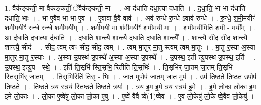 \documentclass[17pt]{extarticle}
\begin{document}
1. वैक॑ङ्कती॒ मा वैक॑ङ्कतीं॒ ॅवैक॑ङ्कती॒ मा । . आ द॑धाति दधा॒त्या द॑धाति । . द॒धा॒ति॒ भा भा द॑धाति दधाति॒ भाः । . भा ए॒वैव भा भा ए॒व । . ए॒वावा वै॒वै वाव॑ । . अव॑ रुन्धे रु॒न्धे ऽवाव॑ रुन्धे । . रु॒न्धे॒ श॒मी॒मयीꣳ॑ शमी॒मयीꣳ॑ रुन्धे रुन्धे शमी॒मयी᳚म् । . श॒मी॒मयी॒ मा श॑मी॒मयीꣳ॑ शमी॒मयी॒ मा । . श॒मी॒मयी॒मिति॑ शमी - मयी᳚म् । . आ द॑धाति दधा॒त्या द॑धाति । . द॒धा॒ति॒ शान्त्यै॒ शान्त्यै॑ दधाति दधाति॒ शान्त्यै᳚ । . शान्त्यै॒ सीद॒ सीद॒ शान्त्यै॒ शान्त्यै॒ सीद॑ । . सीद॒ त्वम् त्वꣳ सीद॒ सीद॒ त्वम् । . त्वम् मा॒तुर् मा॒तु स्त्वम् त्वम् मा॒तुः । . मा॒तु र॒स्या अ॒स्या मा॒तुर् मा॒तु र॒स्याः । . अ॒स्या उ॒पस्थ॑ उ॒पस्थे॑ अ॒स्या अ॒स्या उ॒पस्थे᳚ । . उ॒पस्थ॒ इती त्यु॒पस्थ॑ उ॒पस्थ॒ इति॑ । . उ॒पस्थ॒ इत्यु॒प - स्थे॒ । . इति॑ ति॒सृभि॑ स्ति॒सृभि॒ रितीति॑ ति॒सृभिः॑ । . ति॒सृभि॑र् जा॒तम् जा॒तम् ति॒सृभि॑ स्ति॒सृभि॑र् जा॒तम् । . ति॒सृभि॒रिति॑ ति॒सृ - भिः॒ । . जा॒त मुपोप॑ जा॒तम् जा॒त मुप॑ । . उप॑ तिष्ठते तिष्ठत॒ उपोप॑ तिष्ठते । . ति॒ष्ठ॒ते॒ त्रय॒ स्त्रय॑ स्तिष्ठते तिष्ठते॒ त्रयः॑ । . त्रय॑ इ॒म इ॒मे त्रय॒ स्त्रय॑ इ॒मे । . इ॒मे लो॒का लो॒का इ॒म इ॒मे लो॒काः । . लो॒का ए॒ष्वे॑षु लो॒का लो॒का ए॒षु । . ए॒ष्वे॑ वैवै ष्वे᳚(1॒)ष्वे॑व । . ए॒व लो॒केषु॑ लो॒के ष्वे॒वैव लो॒केषु॑ । \newline
\end{document}
